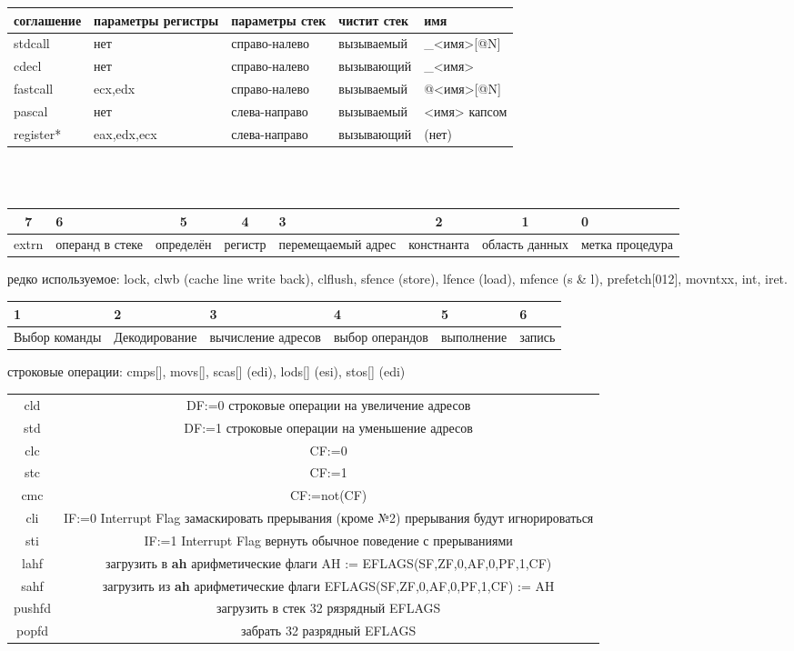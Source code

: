 \documentclass[a4paper,10pt]{article}
\begin{document}
\begin{tabularx}{\textwidth}{|X|X|X|X|X|}
    \hline
    соглашение & параметры регистры & параметры стек & чистит стек & имя \\
    \hline
    stdcall & нет & справо-налево & вызываемый & \_<имя>[@N] \\
    \hline
    cdecl & нет & справо-налево & вызывающий & \_<имя> \\
    \hline
    fastcall & ecx,edx & справо-налево & вызываемый & @<имя>[@N] \\
    \hline
    pascal & нет & слева-направо & вызываемый & <имя> капсом \\
    \hline
    register* & eax,edx,ecx  & слева-направо & вызывающий & (нет) \\
    \hline
\end{tabularx} \\
\\
\begin{tabularx}{\textwidth}{|c|X|c|c|X|c|c|X|}
\hline
7&6&5&4&3&2&1&0 \\
\hline
extrn&операнд в стеке&определён&регистр&перемещаемый адрес&констнанта&область данных&метка процедура \\
\hline
\end{tabularx}
редко используемое: lock, clwb (cache line write back), clflush, sfence (store), lfence (load), mfence (s \& l), prefetch[012], movntxx, int, iret. \\
\begin{tabularx}{\textwidth}{|X|X|X|X|X|X|}
    \hline
    1&2&3&4&5&6 \\
    \hline
    Выбор команды&Декодирование&вычисление адресов&выбор операндов&выполнение&запись \\
    \hline
\end{tabularx}
строковые операции: cmps[], movs[], scas[] (edi), lods[] (esi), stos[] (edi)
\begin{tabular}{|c|c|}
    \hline
    cld & DF:=0 строковые операции на увеличение адресов \\
    std & DF:=1 строковые операции на уменьшение адресов \\
    clc & CF:=0 \\
    stc & CF:=1 \\
    cmc & CF:=not(CF) \\
    cli & IF:=0 Interrupt Flag замаскировать прерывания (кроме №2) прерывания будут игнорироваться \\
    sti & IF:=1 Interrupt Flag вернуть обычное поведение с прерываниями \\
    lahf & загрузить в \textbf{ah} арифметические флаги AH := EFLAGS(SF,ZF,0,AF,0,PF,1,CF)\\
    sahf & загрузить из \textbf{ah} арифметические флаги EFLAGS(SF,ZF,0,AF,0,PF,1,CF) := AH\\
    pushfd & загрузить в стек 32 рязрядный EFLAGS \\
    popfd & забрать 32 разрядный EFLAGS \\
    \hline
\end{tabular}
\end{document}
